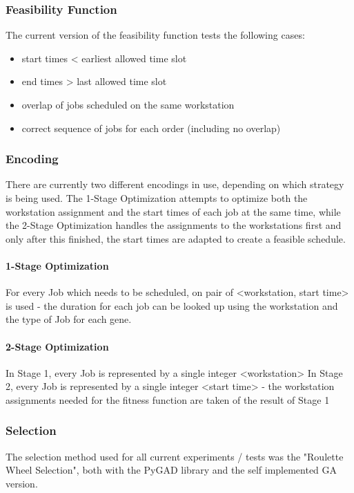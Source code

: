 \documentclass[a4paper,12pt,twoside]{scrreprt}
\begin{document}
\begin{flushleft}
\subsubsection{Feasibility Function}

The current version of the feasibility function tests the following cases:
\begin{itemize}
	\item start times < earliest allowed time slot
	\item end times > last allowed time slot
	\item overlap of jobs scheduled on the same workstation
	\item correct sequence of jobs for each order (including no overlap)
\end{itemize}
\subsubsection{Encoding}
There are currently two different encodings in use, depending on which strategy is being used. The 1-Stage Optimization attempts to optimize both the workstation assignment and the start times of each job at the same time, while the 2-Stage Optimization handles the assignments to the workstations first and only after this finished, the start times are adapted to create a feasible schedule.

\paragraph{1-Stage Optimization}
For every Job which needs to be scheduled, on pair of <workstation, start time> is used - the duration for each job can be looked up using the workstation and the type of Job for each gene.

\paragraph{2-Stage Optimization}
In Stage 1, every Job is represented by a single integer <workstation>
In Stage 2, every Job is represented by a single integer <start time> - the workstation assignments needed for the fitness function are taken of the result of Stage 1

\subsubsection{Selection}
The selection method used for all current experiments / tests was the "Roulette Wheel Selection", both with the PyGAD library and the self implemented GA version.


\end{flushleft}
\end{document}
